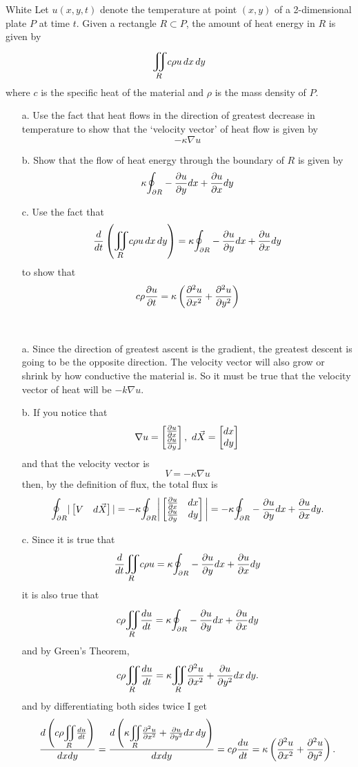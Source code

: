 \documentclass[titlepage]{article}
\begin{document}
\begin{cproblem}{5}{White}
Let $u(x,y,t)$ denote the temperature at point $(x,y)$ of a 2-dimensional plate $P$ at time $t$. Given a rectangle $R\subset P$, the amount of heat energy in $R$ is given by
$$ \bigiint{R}{}c\rho u\,dx\,dy $$
where $c$ is the specific heat of the material and $\rho$ is the mass density of $P$. 
\begin{itemize}
\item[a.] Use the fact that heat flows in the direction of greatest decrease in temperature to show that the `velocity vector' of heat flow is given by
$$ -\kappa\nabla u$$
\item[b.]Show that the flow of heat energy through the boundary of $R$ is given by
$$ \kappa \mathlarger\oint_{\p R} - \frac{\p u}{\p y}dx + \frac{\p u}{\p x}dy$$
\item[c.] Use the fact that
$$ \frac{d}{dt}\left( \bigiint{R}{}c\rho u\,dx\,dy \right) = \kappa \mathlarger\oint_{\p R} - \frac{\p u}{\p y}dx + \frac{\p u}{\p x}dy$$
to show that
$$ c\rho \frac{\partial u}{\partial t} = \kappa\left(\frac{\partial^2 u}{\partial x^2} + \frac{\partial^2 u}{\partial y^2} \right)$$
\end{itemize}
\end{cproblem}
\begin{solution}\ \\
\vspace{-3em}
\begin{itemize}
\item[a.] Since the direction of greatest ascent is the gradient, the greatest descent is going to be the opposite direction. The velocity vector will also grow or shrink by how conductive the material is. So it must be true that the velocity vector of heat will be $-k\nabla u$.
\item[b.] If you notice that
$$ \nabla u = \bmat{\frac{\p u}{\p x} \\ \frac{\p u}{\p y}}, \ d\vec{X} = \bmat{dx \\ dy}$$
and that the velocity vector is
$$ V = -\kappa\nabla u$$
then, by the definition of flux, the total flux is
$$\mathlarger\oint_{\p R} |\bmat{V & d\vec{X}}| = -\kappa \mathlarger\oint_{\p R} \bigg|\bmat{\frac{\p u}{\p x} & dx \\ \frac{\p u}{\p y} & dy}\bigg| = -\kappa \mathlarger\oint_{\p R} - \frac{\p u}{\p y}dx + \frac{\p u}{\p x}dy.$$
\item[c.] Since it is true that
$$\frac{d}{dt}\bigiint{R}{} c\rho u= \kappa \mathlarger\oint_{\p R} -\frac{\p u}{\p y}dx + \frac{\p u}{\p x}dy$$
it is also true that
$$c\rho \bigiint{R}{}\frac{d u}{dt} = \kappa \mathlarger\oint_{\p R} -\frac{\p u}{\p y}dx + \frac{\p u}{\p x}dy$$
and by Green's Theorem,
$$ c\rho \bigiint{R}{}\frac{d u}{dt} = \kappa \bigiint{R}{} \frac{\p^2 u}{\p x^2} + \frac{\p u}{\p y^2}dx\,dy.$$
and by differentiating both sides twice I get
$$\frac{d \left(c\rho \bigiint{R}{}\frac{d u}{dt}\right)}{dx dy} = \frac{d \left(\kappa \bigiint{R}{} \frac{\p^2 u}{\p x^2} + \frac{\p u}{\p y^2}dx\,dy\right)}{dx dy} = c\rho \frac{du}{dt} = \kappa\left(\frac{\p^2 u}{\p x^2} + \frac{\p^2 u}{\p y^2}\right).$$

\end{itemize}
\end{solution}
\end{document}
